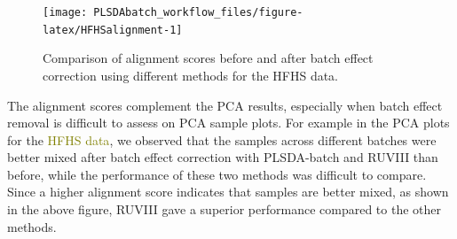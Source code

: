 \documentclass[
]{book}
\newenvironment{Shaded}{\begin{snugshade}}{\end{snugshade}}
\newcommand{\AttributeTok}[1]{\textcolor[rgb]{0.77,0.63,0.00}{#1}}
\newcommand{\DecValTok}[1]{\textcolor[rgb]{0.00,0.00,0.81}{#1}}
\newcommand{\FloatTok}[1]{\textcolor[rgb]{0.00,0.00,0.81}{#1}}
\newcommand{\FunctionTok}[1]{\textcolor[rgb]{0.00,0.00,0.00}{#1}}
\newcommand{\NormalTok}[1]{#1}
\newcommand{\SpecialCharTok}[1]{\textcolor[rgb]{0.00,0.00,0.00}{#1}}
\newcommand{\StringTok}[1]{\textcolor[rgb]{0.31,0.60,0.02}{#1}}
\begin{document}
\begin{Shaded}
\end{Shaded}

\begin{figure}

{\centering \texttt{[image: PLSDAbatch\_workflow\_files/figure-latex/HFHSalignment-1]} 

}

\caption{Comparison of alignment scores before and after batch effect correction using different methods for the HFHS data.}\label{fig:HFHSalignment}
\end{figure}

The alignment scores complement the PCA results, especially when batch effect removal is difficult to assess on PCA sample plots. For example in the PCA plots for the \textcolor{olive}{HFHS data}, we observed that the samples across different batches were better mixed after batch effect correction with PLSDA-batch and RUVIII than before, while the performance of these two methods was difficult to compare. Since a higher alignment score indicates that samples are better mixed, as shown in the above figure, RUVIII gave a superior performance compared to the other methods.
\end{document}
